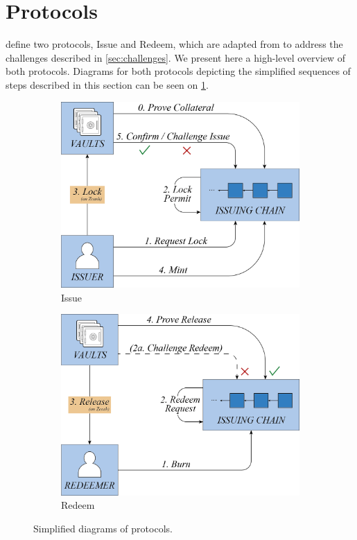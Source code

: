 \section{Protocols}
\label{sec:protocols_highlevel}

\zclaim define two protocols, Issue and Redeem, which are adapted from \xclaim to address the challenges described in \cref{sec:challenges}.
We present here a high-level overview of both protocols.
Diagrams for both protocols depicting the simplified sequences of steps described in this section can be seen on \cref{fig:zclaim_diagrams}.

\begin{figure}
\centering
\begin{subfigure}{.46\textwidth}
  \centering
  \includegraphics[width=\linewidth]{img/issue_simple.png}
  \caption{Issue}
\end{subfigure}
\quad
\begin{subfigure}{.46\textwidth}
  \centering
  \includegraphics[width=\linewidth]{img/redeem_simple.png}
  \caption{Redeem}
\end{subfigure}
\caption{Simplified diagrams of \zclaim protocols.}
\label{fig:zclaim_diagrams}
\end{figure}

